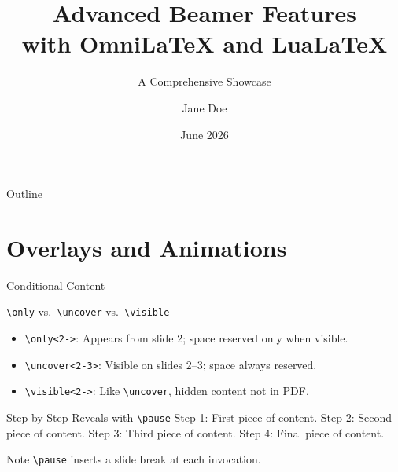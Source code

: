 \documentclass[doctype=beamer, beameraspectratio=169, beamertheme=Madrid, institution=generic]{omnilatex}
\title[Advanced Beamer]{Advanced Beamer Features\\with OmniLaTeX and LuaLaTeX}
\subtitle{A Comprehensive Showcase}
\author[Jane Doe]{Jane Doe}
\institute[OmniLaTeX Project]{OmniLaTeX Project\\\texttt{github.com/WyattAu/OmniLaTeX-template}}
\date{June 2026}
\begin{document}
\begin{frame}[plain]\titlepage\end{frame}
\begin{frame}{Outline}
  \tableofcontents[hideallsubsections]
\end{frame}
\section{Overlays and Animations}
\begin{frame}{Conditional Content}
  \begin{block}{\texttt{\textbackslash only} vs.\ \texttt{\textbackslash uncover} vs.\ \texttt{\textbackslash visible}}
    \begin{itemize}
      \item \texttt{\textbackslash only<2->{}}: Appears from slide 2; space reserved only when visible.
      \item \texttt{\textbackslash uncover<2-3>{}}: Visible on slides 2--3; space always reserved.
      \item \texttt{\textbackslash visible<2->{}}: Like \texttt{\textbackslash uncover}, hidden content not in PDF.
    \end{itemize}
  \end{block}
\end{frame}

\begin{frame}{Step-by-Step Reveals with \texttt{\textbackslash pause}}
  Step 1: First piece of content.\pause
  Step 2: Second piece of content.\pause
  Step 3: Third piece of content.\pause
  Step 4: Final piece of content.
  \vspace{1em}
  \begin{block}{Note}
    \texttt{\textbackslash pause} inserts a slide break at each invocation.
  \end{block}
\end{frame}
\end{document}
